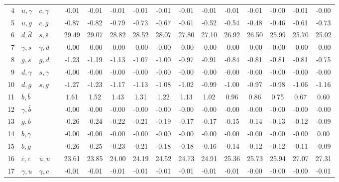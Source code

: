 \begin{tabularx}{\textwidth}{rXXX@{}S@{}S@{}S@{}S@{}S@{}S@{}S@{}S@{}S@{}S@{}S@{}S}
  4 & $u,\gamma$       & $c,\gamma$       &                 & -0.01 & -0.01 & -0.01 & -0.01 & -0.01 & -0.01 & -0.01 & -0.01 & -0.01 & -0.00 & -0.01 & -0.00 \\
  5 & $u,g$            & $c,g$            &                 & -0.87 & -0.82 & -0.79 & -0.73 & -0.67 & -0.61 & -0.52 & -0.54 & -0.48 & -0.46 & -0.61 & -0.73 \\
  6 & $d,\bar d$       & $s,\bar s$       &                 & 29.49 & 29.07 & 28.82 & 28.52 & 28.07 & 27.80 & 27.10 & 26.92 & 26.50 & 25.99 & 25.70 & 25.02 \\
  7 & $\gamma, \bar s$ & $\gamma, \bar d$ &                 & -0.00 & -0.00 & -0.00 & -0.00 & -0.00 & -0.00 & -0.00 & -0.00 & -0.00 & -0.00 & -0.00 & -0.00 \\
  8 & $g,\bar s$       & $g,\bar d$       &                 & -1.23 & -1.19 & -1.13 & -1.07 & -1.00 & -0.97 & -0.91 & -0.84 & -0.81 & -0.81 & -0.81 & -0.75 \\
  9 & $d,\gamma$       & $s,\gamma$       &                 & -0.00 & -0.00 & -0.00 & -0.00 & -0.00 & -0.00 & -0.00 & -0.00 & -0.00 & -0.00 & -0.00 & -0.00 \\
 10 & $d,g$            & $s,g$            &                 & -1.27 & -1.23 & -1.17 & -1.13 & -1.08 & -1.02 & -0.99 & -1.00 & -0.97 & -0.98 & -1.06 & -1.16 \\
 11 & $b,\bar b$       &                  &                 &  1.61 &  1.52 &  1.43 &  1.31 &  1.22 &  1.13 &  1.02 &  0.96 &  0.86 &  0.75 &  0.67 &  0.60 \\
 12 & $\gamma,\bar b$  &                  &                 & -0.00 & -0.00 & -0.00 & -0.00 & -0.00 & -0.00 & -0.00 & -0.00 & -0.00 & -0.00 & -0.00 & -0.00 \\
 13 & $g,\bar b$       &                  &                 & -0.26 & -0.24 & -0.22 & -0.21 & -0.19 & -0.17 & -0.17 & -0.15 & -0.14 & -0.13 & -0.12 & -0.09 \\
 14 & $b,\gamma$       &                  &                 & -0.00 & -0.00 & -0.00 & -0.00 & -0.00 & -0.00 & -0.00 & -0.00 & -0.00 & -0.00 & -0.00 &  0.00 \\
 15 & $b,g$            &                  &                 & -0.26 & -0.25 & -0.23 & -0.21 & -0.18 & -0.18 & -0.16 & -0.14 & -0.12 & -0.12 & -0.11 & -0.09 \\
 16 & $\bar c,c$       & $\bar u,u$       &                 & 23.61 & 23.85 & 24.00 & 24.19 & 24.52 & 24.73 & 24.91 & 25.36 & 25.73 & 25.94 & 27.07 & 27.31 \\
 17 & $\gamma, u$      & $\gamma, c$      &                 & -0.01 & -0.01 & -0.01 & -0.01 & -0.01 & -0.01 & -0.01 & -0.01 & -0.00 & -0.00 & -0.00 & -0.01 \\

\end{tabularx}
